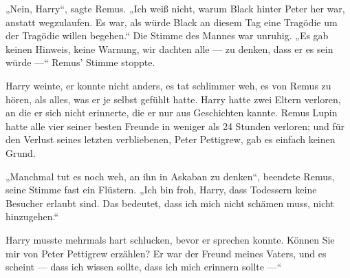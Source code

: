 \later

„Nein, Harry“, sagte Remus.
„Ich weiß nicht, warum Black hinter Peter her war, anstatt wegzulaufen. Es war, als würde Black an diesem Tag eine Tragödie um der Tragödie willen begehen.“ Die Stimme des Mannes war unruhig.
„Es gab keinen Hinweis, keine Warnung, wir dachten alle — zu denken, dass er es sein würde —“ Remus’ Stimme stoppte.

Harry weinte, er konnte nicht anders, es tat schlimmer weh, es von Remus zu hören, als alles, was er je selbst gefühlt hatte. Harry hatte zwei Eltern verloren, an die er sich nicht erinnerte, die er nur aus Geschichten kannte. Remus Lupin hatte alle vier seiner besten Freunde in weniger als 24 Stunden verloren; und für den Verlust seines letzten verbliebenen, Peter Pettigrew, gab es einfach keinen Grund.

„Manchmal tut es noch weh, an ihn in Askaban zu denken“, beendete Remus, seine Stimme fast ein Flüstern.
„Ich bin froh, Harry, dass Todessern keine Besucher erlaubt sind. Das bedeutet, dass ich mich nicht schämen muss, nicht hinzugehen.“

Harry musste mehrmals hart schlucken, bevor er sprechen konnte.
Können Sie mir von Peter Pettigrew erzählen? Er war der Freund meines Vaters, und es scheint — dass ich wissen sollte, dass ich mich erinnern sollte —“

